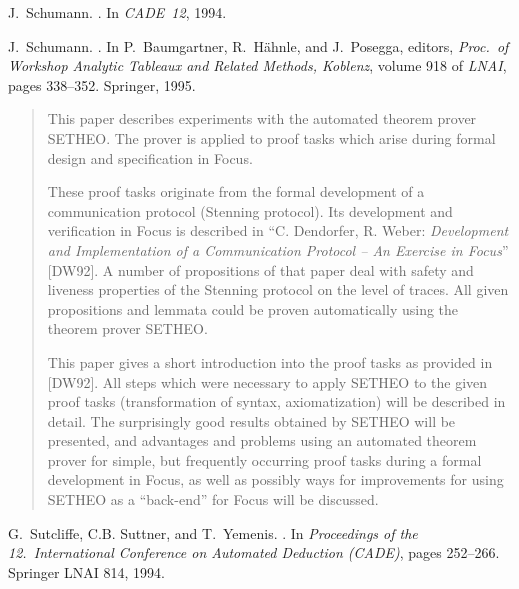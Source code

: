 \begin{thebibliography}{}
J.~Schumann.
.
\newblock In {\em CADE~12}, 1994.


J.~Schumann.
.
\newblock In P.~Baumgartner, R.~H{\"a}hnle, and J.~Posegga, editors, {\em
  Proc.~of Workshop Analytic Tableaux and Related Methods, Koblenz}, volume 918
  of {\em LNAI}, pages 338--352. Springer, 1995.
\begin{quotation}
This paper describes experiments with the automated theorem prover
{\small SETHEO}.
The prover is applied to proof tasks which arise during
formal design and specification in {\sc Focus}.

These proof tasks originate from the formal development of a
communication protocol (Stenning protocol).
Its development and verification in {\sc Focus} is described
in ``C. Dendorfer, R. Weber: {\em Development and Implementation of a
Communication Protocol -- An Exercise in {\sc Focus}\/}'' [DW92].
%
A number of propositions of that paper deal with
safety and liveness properties of the Stenning protocol on the level of
traces.
All given propositions and lemmata could be proven
automatically using the theorem prover {\small SETHEO}.

This paper gives a short introduction into
the proof tasks as provided in [DW92].
All steps which were necessary to apply {\small SETHEO} to the
given proof tasks (transformation of syntax, axiomatization) will be described
in detail.
The surprisingly good results obtained by {\small SETHEO} will be presented,
and advantages and problems using an automated theorem prover
for simple, but  frequently occurring proof tasks during a formal development
in {\sc Focus}, as well as possibly ways for improvements
for using {\small SETHEO} as a ``back-end'' for
{\sc Focus} will be discussed.
\end{quotation}

G.~Sutcliffe, C.B. Suttner, and T.~Yemenis.
.
\newblock In {\em Proceedings of the 12.\ International Conference on Automated
  Deduction (CADE)}, pages 252--266. Springer LNAI 814, 1994.

\end{thebibliography}

